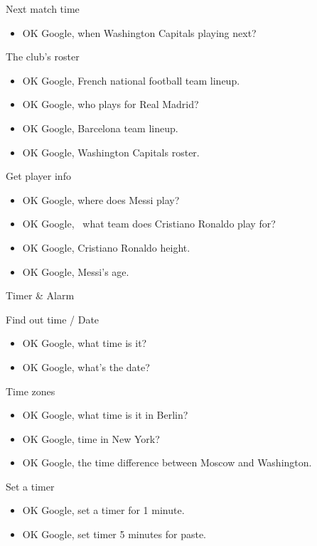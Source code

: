 \documentclass[
  a4paper,
]{article}
\providecommand{\tightlist}{%
  \setlength{\itemsep}{0pt}\setlength{\parskip}{0pt}}\usepackage{longtable,booktabs,array}
\begin{document}
Next match time

\begin{itemize}
\tightlist
\item
  OK Google, when Washington Capitals playing next?
\end{itemize}

The club's roster

\begin{itemize}
\item
  OK Google, French national football team lineup.
\item
  OK Google, who plays for Real Madrid?
\item
  OK Google, Barcelona team lineup.
\item
  OK Google, Washington Capitals roster.
\end{itemize}

Get player info

\begin{itemize}
\item
  OK Google, where does Messi play?
\item
  OK Google,~ what team does Cristiano Ronaldo play for?
\item
  OK Google, Cristiano Ronaldo height.
\item
  OK Google, Messi's age.
\end{itemize}

Timer \& Alarm

Find out time / Date

\begin{itemize}
\item
  OK Google, what time is it?
\item
  OK Google, what's the date?
\end{itemize}

Time zones

\begin{itemize}
\item
  OK Google, what time is it in Berlin?
\item
  OK Google, time in New York?
\item
  OK Google, the time difference between Moscow and Washington.
\end{itemize}

Set a timer

\begin{itemize}
\item
  OK Google, set a timer for 1 minute.
\item
  OK Google, set timer 5 minutes for paste.
\end{itemize}
\end{document}
